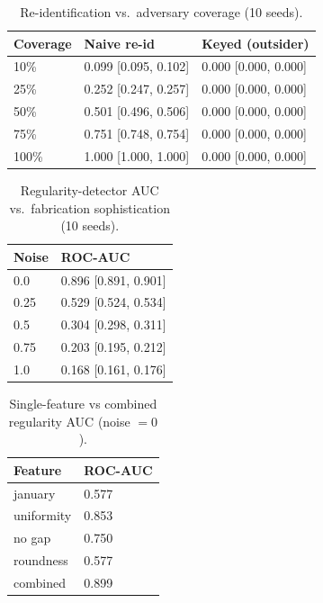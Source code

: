 \documentclass[11pt]{article}
\begin{document}
\begin{table}[h]\centering\small\caption{Re-identification vs.\ adversary coverage (10 seeds).}\label{tab:app:priv}
\begin{tabular}{lll}\toprule Coverage & Naive re-id & Keyed (outsider)\\\midrule
10\% & 0.099 [0.095, 0.102] & 0.000 [0.000, 0.000]\\
25\% & 0.252 [0.247, 0.257] & 0.000 [0.000, 0.000]\\
50\% & 0.501 [0.496, 0.506] & 0.000 [0.000, 0.000]\\
75\% & 0.751 [0.748, 0.754] & 0.000 [0.000, 0.000]\\
100\% & 1.000 [1.000, 1.000] & 0.000 [0.000, 0.000]\\
\bottomrule\end{tabular}\end{table}
\begin{table}[h]\centering\small\caption{Regularity-detector AUC vs.\ fabrication sophistication (10 seeds).}\label{tab:app:soph}
\begin{tabular}{ll}\toprule Noise & ROC-AUC\\\midrule
0.0 & 0.896 [0.891, 0.901]\\
0.25 & 0.529 [0.524, 0.534]\\
0.5 & 0.304 [0.298, 0.311]\\
0.75 & 0.203 [0.195, 0.212]\\
1.0 & 0.168 [0.161, 0.176]\\
\bottomrule\end{tabular}\end{table}
\begin{table}[h]\centering\small\caption{Single-feature vs combined regularity AUC (noise $=0$).}\label{tab:app:abl}
\begin{tabular}{ll}\toprule Feature & ROC-AUC\\\midrule
january & 0.577\\
uniformity & 0.853\\
no gap & 0.750\\
roundness & 0.577\\
combined & 0.899\\
\bottomrule\end{tabular}\end{table}
\end{document}
